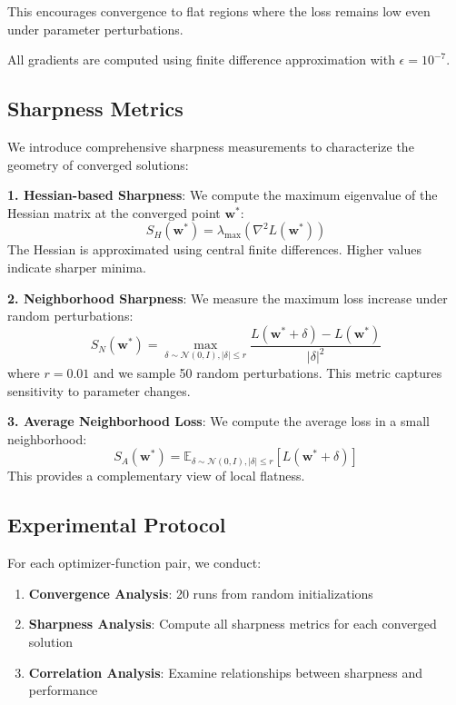 \documentclass[12pt,a4paper]{article}
\begin{document}
This encourages convergence to flat regions where the loss remains low even under parameter perturbations.

All gradients are computed using finite difference approximation with $\epsilon=10^{-7}$.

\subsection{Sharpness Metrics}

We introduce comprehensive sharpness measurements to characterize the geometry of converged solutions:

\textbf{1. Hessian-based Sharpness}: We compute the maximum eigenvalue of the Hessian matrix at the converged point $\mathbf{w}^*$:
\begin{equation}
S_H(\mathbf{w}^*) = \lambda_{\max}(\nabla^2 L(\mathbf{w}^*))
\end{equation}
The Hessian is approximated using central finite differences. Higher values indicate sharper minima.

\textbf{2. Neighborhood Sharpness}: We measure the maximum loss increase under random perturbations:
\begin{equation}
S_N(\mathbf{w}^*) = \max_{\delta \sim \mathcal{N}(0,I), |\delta| \leq r} \frac{L(\mathbf{w}^* + \delta) - L(\mathbf{w}^*)}{|\delta|^2}
\end{equation}
where $r=0.01$ and we sample 50 random perturbations. This metric captures sensitivity to parameter changes.

\textbf{3. Average Neighborhood Loss}: We compute the average loss in a small neighborhood:
\begin{equation}
S_A(\mathbf{w}^*) = \mathbb{E}_{\delta \sim \mathcal{N}(0,I), |\delta| \leq r}[L(\mathbf{w}^* + \delta)]
\end{equation}
This provides a complementary view of local flatness.

\subsection{Experimental Protocol}

For each optimizer-function pair, we conduct:

\begin{enumerate}
    \item \textbf{Convergence Analysis}: 20 runs from random initializations
    \item \textbf{Sharpness Analysis}: Compute all sharpness metrics for each converged solution
    \item \textbf{Correlation Analysis}: Examine relationships between sharpness and performance
\end{enumerate}
\end{document}
